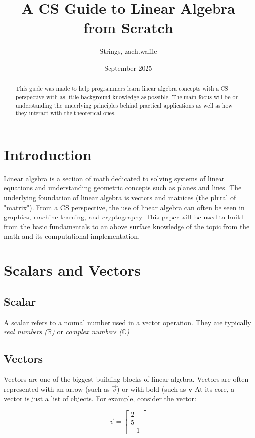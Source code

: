 \documentclass[12pt]{report}
\title{A CS Guide to Linear Algebra from Scratch}
\author{Strings, zach.waffle}
\date{September 2025}
\begin{document}
\maketitle

\begin{abstract}
    This guide was made to help programmers learn linear algebra concepts with a CS perspective with as little background knowledge as possible. The main focus will be on understanding the underlying principles behind practical applications as well as how they interact with the theoretical ones.
\end{abstract}

\chapter{Introduction}
    Linear algebra is a section of math dedicated to solving systems of linear equations and understanding geometric concepts such as planes and lines. The underlying foundation of linear algebra is vectors and matrices (the plural of "matrix"). From a CS perspective, the use of linear algebra can often be seen in graphics, machine learning, and cryptography.
    This paper will be used to build from the basic fundamentals to an above surface knowledge of the topic from the math and its computational implementation.

\chapter{Scalars and Vectors}
    \section{Scalar}
        A scalar refers to a normal number used in a vector operation.
        They are typically \emph{real numbers ($\mathbb{R}$)} or \emph{complex numbers ($\mathbb{C}$)} 
        
    \section{Vectors}
        Vectors are one of the biggest building blocks of linear algebra. Vectors are often represented with an arrow (such as $\vec{v}$) or with bold (such as $\mathbf{v}$
        At its core, a vector is just a list of objects. For example, consider the vector:

        \begin{equation}
            \vec{v} = \begin{bmatrix} 2 \\ 5 \\ -1 \end{bmatrix}
        \end{equation} \\
\end{document}
